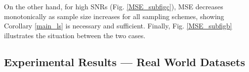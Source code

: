 On the other hand, for high SNRs (Fig. \ref{MSE_subfigc}), MSE decreases monotonically as sample size increases for all sampling schemes, showing Corollary \ref{main_ls} is necessary and sufficient. %
Finally, Fig. \ref{MSE_subfigb} illustrates the situation between the two cases.

{\color{black}
\subsection{Experimental Results --- Real World Datasets}


}
